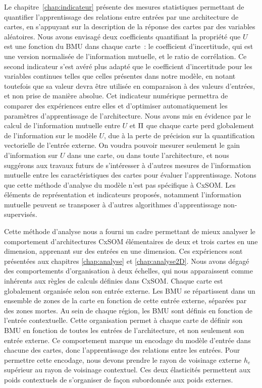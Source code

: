 Le chapitre~\ref{chap:indicateur} présente des mesures statistiques permettant de quantifier l'apprentissage des relations entre entrées par une architecture de cartes, en s'appuyant sur la description de la réponse des cartes par des variables aléatoires.
Nous avons envisagé deux coefficients quantifiant la propriété que $U$ est une fonction du BMU dans chaque carte~: le coefficient d'incertitude, qui est une version normalisée de l'information mutuelle, et le ratio de corrélation.
Ce second indicateur s'est avéré plus adapté que le coefficient d'incertitude pour les variables continues telles que celles présentes dans notre modèle, en notant toutefois que sa valeur devra être utilisée en comparaison à des valeurs d'entrées, et non prise de manière absolue. 
Cet indicateur numérique permettra de comparer des expériences entre elles et d'optimiser automatiquement les paramètres d'apprentissage de l'architecture.
Nous avons mis en évidence par le calcul de l'information mutuelle entre $U$ et $\Pi$ que chaque carte perd  globalement de l'information sur le modèle $U$, due à la perte de précision sur la quantification vectorielle de l'entrée externe. On voudra pouvoir mesurer seulement le gain d'information sur $U$ dans une carte, ou dans toute l'architecture, et nous suggérons aux travaux futurs de s'intéresser à d'autres mesures de l'information mutuelle entre les caractéristiques des cartes pour évaluer l'apprentissage.
Notons que cette méthode d'analyse du modèle n'est pas spécifique à CxSOM. Les éléments de représentation et indicateurs proposés, notamment l'information mutuelle peuvent se transposer à d'autres algorithmes d'apprentissage non-supervisés.

Cette méthode d'analyse nous a fourni un cadre permettant de mieux analyser le comportement d'architectures CxSOM élémentaires de deux et trois cartes en une dimension, apprenant sur des entrées en une dimension.
Ces expériences sont présentées aux chapitres \ref{chap:analyse} et \ref{chap:analyse2D}.
Nous avons dégagé des comportements d'organisation à deux échelles, qui nous apparaissent comme inhérents aux règles de calculs définies dans CxSOM. Chaque carte est globalement organisée selon son entrée externe. Les BMU se répartissent dans un ensemble de zones de la carte en fonction de cette entrée externe, séparées par des zones mortes. Au sein de chaque région, les BMU sont définis en fonction de l'entrée contextuelle. 
Cette organisation permet à chaque carte de définir son BMU en fonction de toutes les entrées de l'architecture, et non seulement son entrée externe. Ce comportement marque un encodage du modèle d'entrée dans chacune des cartes, donc l'apprentissage des relations entre les entrées.
Pour permettre cette encodage, nous devons prendre le rayon de voisinage externe $h_e$ supérieur au rayon de voisinage contextuel. Ces deux élasticités permettent aux poids contextuels de s'organiser de façon subordonnée aux poids externes.


